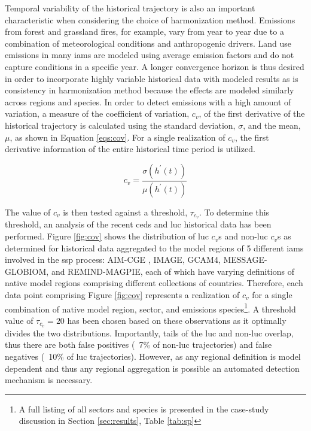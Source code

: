 \documentclass[review]{elsarticle}
\begin{document}
Temporal variability of the historical trajectory is also an important
characteristic when considering the choice of harmonization method.  Emissions
from forest and grassland fires, for example, vary from year to year due to a
combination of meteorological conditions and anthropogenic drivers. Land use
emissions in many \glspl{iam} are modeled using average emission factors and do not
capture conditions in a specific year. A longer convergence horizon is thus
desired in order to incorporate highly variable historical data with modeled
results as is consistency in harmonization method because the effects are
modeled similarly across regions and species. In order to detect emissions with
a high amount of variation, a measure of the coefficient of variation, $c_v$, of
the first derivative of the historical trajectory is calculated using the
standard deviation, $\sigma$, and the mean, $\mu$, as shown in Equation
\ref{eqs:cov}. For a single realization of $c_v$, the first derivative
information of the entire historical time period is utilized.

\begin{equation}\label{eqs:cov}
    c_v =  \frac{\sigma(h^{\prime}(t))}{\mu(h^{\prime}(t))}
\end{equation}

The value of $c_v$ is then tested against a threshold, $\tau_{c_v}$. To
determine this threshold, an analysis of the recent \gls{ceds} and \gls{luc}
historical data has been performed. Figure \ref{fig:cov} shows the distribution
of \gls{luc} $c_v$s and non-\gls{luc} $c_v$s as determined for historical data
aggregated to the model regions of 5 different \glspl{iam} involved in the
\gls{ssp} process: AIM-CGE \cite{fujimori_ssp3:_2017},
IMAGE\cite{van_vuuren_energy_2017}, GCAM4\cite{calvin_ssp4:_2017},
MESSAGE-GLOBIOM\cite{fricko_marker_2017}, and
REMIND-MAGPIE\cite{kriegler_fossil-fueled_2017}, each of which have varying
definitions of native model regions comprising different collections of
countries. Therefore, each data point comprising Figure \ref{fig:cov} represents
a realization of $c_v$ for a single combination of native model region, sector,
and emissions species\footnote{A full listing of all sectors and species is
  presented in the case-study discussion in Section \ref{sec:results}, Table
  \ref{tab:sp}}. A threshold value of $\tau_{c_v} = 20$ has been chosen based on
these observations as it optimally divides the two distributions. Importantly,
tails of the \gls{luc} and non-\gls{luc} overlap, thus there are both false
positives (~7\% of non-\gls{luc} trajectories) and false negatives (~10\% of
\gls{luc} trajectories). However, as any regional definition is model dependent
and thus any regional aggregation is possible an automated detection mechanism
is necessary.
\end{document}
